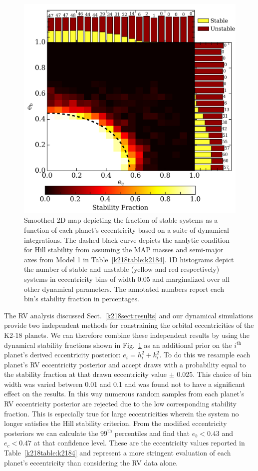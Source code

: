 \begin{figure}
\centering
\includegraphics[width=0.6\hsize]{figures/ecc_stability.png}
\caption{Smoothed 2D map depicting the fraction of stable systems as a function of each planet's
  eccentricity based on a suite of dynamical integrations.
  The dashed black curve depicts the analytic condition for Hill stability from
  \cite{gladman93} assuming the MAP masses and semi-major axes from Model 1 in
  Table~\ref{k218table:k2184}. 1D histograms depict the number of
  stable and unstable (yellow and red respectively) systems in
  eccentricity bins of width 0.05 and marginalized over all other dynamical parameters.
  The annotated numbers report each bin's stability fraction in percentages. 
  \label{k218fig:dynam}}
\end{figure}


The RV analysis discussed Sect.~\ref{k218sect:results} and our dynamical simulations provide two
independent methods for constraining the orbital eccentricities of the K2-18 planets. We can
therefore combine these independent results by using the dynamical stability fractions
shown in Fig.~\ref{k218fig:dynam} as an additional prior on the $i^{\text{th}}$ planet's derived
eccentricity posterior: $e_i = h_i^2 + k_i^2$. To do this we resample each planet's RV eccentricity
posterior and accept draws with a probability equal to the stability fraction at that drawn
eccentricity value $\pm$ 0.025. This choice of bin width was varied between 0.01 and 0.1 and
was found not to have a significant effect on the results. In this way numerous random samples
from each planet's RV eccentricity posterior
are rejected due to the low corresponding stability fraction. This is especially true
for large eccentricities wherein the system no longer satisfies the Hill stability criterion.
From the modified eccentricity posteriors we can calculate the
$99^{\text{th}}$ percentiles and find that $e_b < 0.43$ and $e_c < 0.47$   
at that confidence level. These are the eccentricity values reported in Table~\ref{k218table:k2184}
and represent a more stringent evaluation of each planet's eccentricity than considering the RV data
alone.

